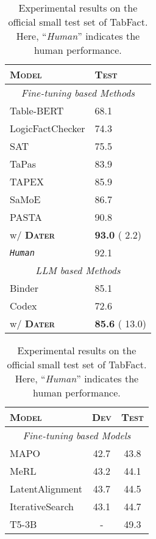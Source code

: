 \documentclass{article}
\begin{document}
\begin{table}
\centering
\begin{minipage}[t]{0.45\linewidth}
  \centering
  \begin{tabular}{ll}
    \toprule
    \textsc{\textbf{Model}} & \textsc{\textbf{Test}} \\
    \midrule
    \multicolumn{2}{c}{\textit{  Fine-tuning based Methods}} \\
    Table-BERT & 68.1 \\
    LogicFactChecker & 74.3\\
    SAT     &   75.5 \\
    TaPas & 83.9\\
    TAPEX & 85.9 \\
    SaMoE & 86.7\\
    PASTA & 90.8 \\
    \rowcolor[RGB]{237,237,237} \quad w/ \textbf{\textsc{Dater}} & \textbf{93.0} ( 2.2) \\
    \midrule
    \textit{\texttt{Human}}& {92.1}\\
    \midrule
    \multicolumn{2}{c}{\textit{  LLM based Methods}} \\
    Binder & 85.1 \\
    Codex & 72.6 \\
    \rowcolor[RGB]{237,237,237} \quad w/ \textbf{\textsc{Dater}} & \textbf{85.6} ( 13.0)  \\
    \bottomrule
  \end{tabular}
  \vspace{0.2cm}
  \caption{Experimental results on the official small test set of TabFact. Here, ``\textit{Human}'' indicates the human performance.}
  \label{tab:tabfact_small}
\end{minipage}
\hspace{0.3cm}
\begin{minipage}[t]{0.5\linewidth}
  \centering
  \begin{tabular}{lcc}
    \toprule
    \textsc{\textbf{Model}} & \textsc{\textbf{Dev}} & \textsc{\textbf{Test}} \\
    \midrule
    \multicolumn{3}{c}{\textit{ Fine-tuning based Models}} \\
    MAPO & 42.7 & 43.8 \\
    MeRL & 43.2 & 44.1 \\
    LatentAlignment & 43.7 & 44.5\\
    IterativeSearch & 43.1 & 44.7\\
    T5-3B  & - & 49.3 \\

\end{tabular}
\end{minipage}
\end{table}
\end{document}
